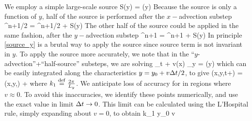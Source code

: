 \documentclass[11pt]{article}
\begin{document}
We employ a simple large-scale source
\beq
S(y) = \cos \left(y\right)\per
\eeq
Because the source is only a function of $y$, half of the source is performed after the $x-$advection
substep
\beq
\label{source_x}
\vth^{n+1/2} = \vth^{n+1/2} +  S(y)\per
\eeq
The other half of the source could be applied in the same fashion, after the $y-$advection
substep
\beq
\label{source_y}
\vth^{n+1} = \vth^{n+1} +  S(y)\per
\eeq
In principle \eqref{source_y} is a brutal way to apply the source since source term is not invariant in $y$.
To apply the source more accurately, we note that in the ``$y$-advection''+``half-source'' substeps, we are
solving
\beq
\vth_t + v(x) \vth_y = \cos \left(y\right)\com
\eeq
which can be easily integrated along the characteristics $y = y_0 + v \Delta t/2$, to give
\beq
\label{adv_source_y}
\vth(x,y,t+\dt) = \vth(x,y,\dt) + \per
\eeq
where $k_1 \stackrel{\mathrm{def}}{=} \frac{2\pi}{L_y}$. We anticipate loss of accuracy for in regions where $v\approx 0$. To
avoid this inaccuracies, we identify these points numerically, and use the exact value in limit $\Delta t \to 0$.
This limit can be calculated using the L'Hospital rule, simply expanding about $v=0$, to obtain
\beq
{} \to {}\cos k_1 y_0 \qquad {}
\qquad v \per
\eeq

\end{document}
